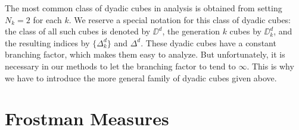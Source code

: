
The most common class of dyadic cubes in analysis is obtained from setting $N_k = 2$ for each $k$. We reserve a special notation for this class of dyadic cubes: the class of all such cubes is denoted by $\DD^d$, the generation $k$ cubes by $\DD^d_k$, and the resulting indices by $\{ \Delta_k^d \}$ and $\Delta^d$. These dyadic cubes have a constant branching factor, which makes them easy to analyze. But unfortunately, it is necessary in our methods to let the branching factor to tend to $\infty$. This is why we have to introduce the more general family of dyadic cubes given above.


\section{Frostman Measures}


